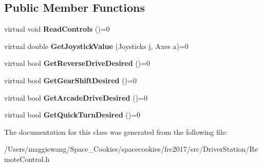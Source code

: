 \subsection*{Public Member Functions}
\begin{DoxyCompactItemize}
\item 
\mbox{\label{class_remote_control_a7dbf96cb324ba35eed5d321b20a684cc}} 
virtual void {\bfseries Read\+Controls} ()=0
\item 
\mbox{\label{class_remote_control_a8ab237f494be1e03acf73c7f1a074dc4}} 
virtual double {\bfseries Get\+Joystick\+Value} (Joysticks j, Axes a)=0
\item 
\mbox{\label{class_remote_control_ac4a415757aa25c0aaa51c079beb8b5ec}} 
virtual bool {\bfseries Get\+Reverse\+Drive\+Desired} ()=0
\item 
\mbox{\label{class_remote_control_a6bc6abea1db8060576faf0bfd764cd9c}} 
virtual bool {\bfseries Get\+Gear\+Shift\+Desired} ()=0
\item 
\mbox{\label{class_remote_control_a2899dfb8cf4f9530d11de7962293f2bf}} 
virtual bool {\bfseries Get\+Arcade\+Drive\+Desired} ()=0
\item 
\mbox{\label{class_remote_control_a20ad515a8b9c6f842844d3081ce29e1c}} 
virtual bool {\bfseries Get\+Quick\+Turn\+Desired} ()=0
\end{DoxyCompactItemize}


The documentation for this class was generated from the following file\+:\begin{DoxyCompactItemize}
\item 
/\+Users/maggiewang/\+Space\+\_\+\+Cookies/spacecookies/frc2017/src/\+Driver\+Station/Remote\+Control.\+h\end{DoxyCompactItemize}
